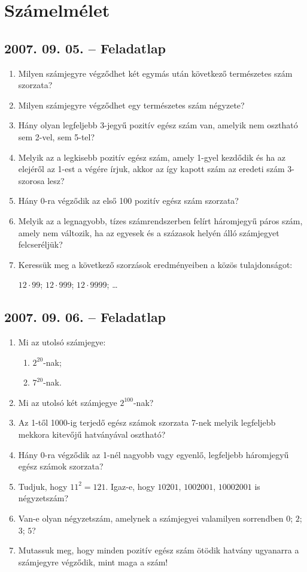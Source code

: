 \documentclass{article}
\newenvironment{abc}{\begin{enumerate}[label=\textit{\alph*})]}{\end{enumerate}}
\begin{document}
\section*{Számelmélet}





\subsection*{2007. 09. 05. -- Feladatlap}
\begin{enumerate}
\item Milyen számjegyre végződhet két egymás után következő természetes szám szorzata?
\item Milyen számjegyre végződhet egy természetes szám négyzete?
\item Hány olyan legfeljebb 3-jegyű pozitív egész szám van, amelyik nem osztható sem 2-vel, sem 5-tel?
\item Melyik az a legkisebb pozitív egész szám, amely 1-gyel kezdődik és ha az elejéről az 1-est a végére írjuk, akkor az így kapott szám az eredeti szám 3-szorosa lesz?
\item Hány 0-ra végződik az első 100 pozitív egész szám szorzata?
\item Melyik az a legnagyobb, tízes számrendszerben felírt háromjegyű páros szám, amely nem változik, ha az egyesek és a százasok helyén álló számjegyet felcseréljük?
\item Keressük meg a következő szorzások eredményeiben a közös tulajdonságot:

$12\cdot99$; $12\cdot999$; $12\cdot9999$; \ldots
\end{enumerate}


\subsection*{2007. 09. 06. -- Feladatlap}
\begin{enumerate}
\item Mi az utolsó számjegye:
\begin{abc}
\item $2^{20}$-nak;
\item $7^{20}$-nak.
\end{abc}
\item Mi az utolsó két számjegye $2^{100}$-nak?
\item Az 1-től 1000-ig terjedő egész számok szorzata 7-nek melyik legfeljebb mekkora kitevőjű hatványával osztható?
\item Hány 0-ra végződik az 1-nél nagyobb vagy egyenlő, legfeljebb háromjegyű egész számok szorzata?
\item Tudjuk, hogy $11^2=121$. Igaz-e, hogy $10201$, $1002001$, $10002001$ is négyzetszám?
\item Van-e olyan négyzetszám, amelynek a számjegyei valamilyen sorrendben $0$; $2$; $3$; $5$?
\item Mutassuk meg, hogy minden pozitív egész szám ötödik hatvány ugyanarra a számjegyre végződik, mint maga a szám!
\end{enumerate}
\end{document}
